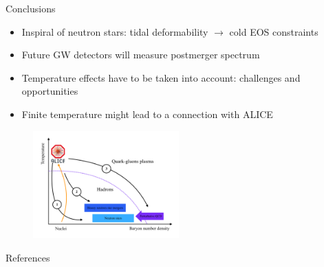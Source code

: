 \documentclass[usenames,dvipsnames,t]{beamer}
\begin{document}
\begin{frame}{Conclusions}

  \def\x{3mm}
  \begin{itemize}
    \item Inspiral of neutron stars: tidal deformability $\rightarrow$ cold EOS constraints
    
    \vspace{\x}
    
    \item Future GW detectors will measure postmerger spectrum
    
    \vspace{\x}
    
    \item Temperature effects have to be taken into account: challenges and opportunities
    
    \vspace{\x}
    
    \item Finite temperature might lead to a connection with ALICE
  \end{itemize}

  \begin{figure}
    \centering
    \includegraphics[width=0.5\textwidth]{Figures/QCD_phase_diagram.pdf}
  \end{figure}
  
\end{frame}


\begin{frame}{References}
  
    \printbibliography

\end{frame}
\end{document}

